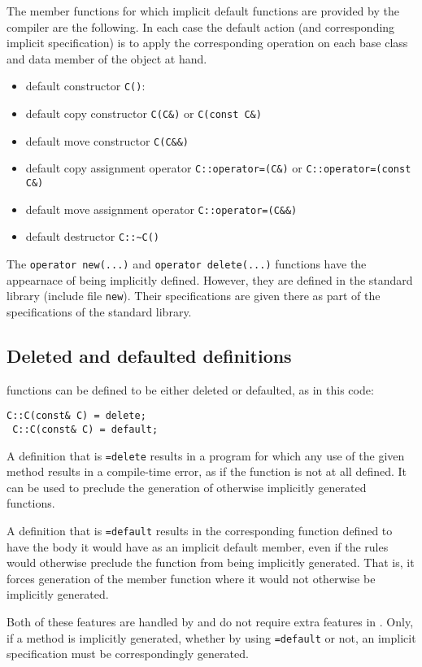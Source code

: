 The member functions for which implicit default functions are provided by the compiler are the following. In each case the default action (and corresponding implicit specification) is to apply the corresponding operation on each base class and data member of the object at hand.
\begin{itemize}
	\item default constructor \lstinline|C()|: 
	\item default copy constructor \lstinline|C(C&)| or \lstinline|C(const C&)|
	\item default move constructor \lstinline|C(C&&)|
	\item default copy assignment operator \lstinline|C::operator=(C&)| or \lstinline|C::operator=(const C&)|
	\item default move assignment operator \lstinline|C::operator=(C&&)| 
	\item default destructor \lstinline|C::~C()|
\end{itemize}

The \lstinline|operator new(...)| and 
\lstinline|operator delete(...)| functions have the appearnace of being implicitly defined. However, they are defined in the standard library
(include file \lstinline|new|). Their specifications are given there as
part of the specifications of the standard library.

\subsection{Deleted and defaulted definitions}

 \lang{} functions can be defined to be either deleted or defaulted, as in this code:
 \begin{lstlisting}[deletekeywords={default}]
 C::C(const& C) = delete; 
 C::C(const& C) = default; 
 \end{lstlisting}
 A definition that is \lstinline|=delete| results in a program for which any use of the given method results in a compile-time error,
 as if the function is not at all defined. It can be used to preclude the
 generation of otherwise implicitly generated functions.
 
 A definition that is \lstinline|=default| results in the corresponding
 function defined to have the body it would have as an implicit default
 member, even if the \lang{} rules would otherwise preclude the 
 function from being implicitly generated. That is, it forces 
 generation of the member function where it would not otherwise be implicitly generated.
 
Both of these features are handled by \lang{} and do not require 
extra features in \NAME{}. Only, if a method is implicitly generated, whether by using \lstinline|=default| or not, an implicit specification must be correspondingly generated.